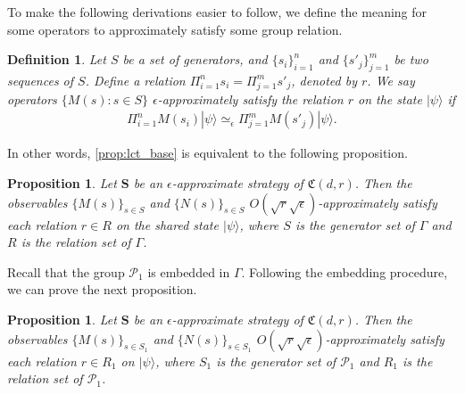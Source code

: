 \documentclass[11pt,letterpaper]{article}
\newcommand{\ket}[1]{|#1\rangle}
\newcommand{\1}{\mathbb{1}}
\newcommand{\Pg}{\mathcal{P}}
\newcommand{\fC}{\mathfrak{C}}
\newcommand{\bS}{\pmb{S}}
\newcommand{\ep}{\epsilon}
\newcommand{\se}{\sqrt{\epsilon}}
\newcommand{\sr}{\sqrt{r}}
\newcommand{\appd}[1]{\simeq_{#1}}
\newtheorem{proposition}[theorem]{Proposition}
\newtheorem{definition}[theorem]{Definition}
\theoremstyle{definition}
\begin{document}
To make the following derivations easier to follow, we define the meaning
for some operators to approximately satisfy some group relation.
\begin{definition}
    Let $S$ be a set of generators, and $\{s_i\}_{i=1}^n$ and $\{s'_j\}_{j=1}^m$
    be two sequences of $S$.
    Define a relation $\Pi_{i=1}^n s_i = \Pi_{j=1}^m s'_j$, denoted by $r$.
    We say operators $\{M(s) : s \in S\}$ $\ep$-approximately satisfy the relation
    $r$ on the state $\ket{\psi}$ if 
    \begin{align*}
        \Pi_{i=1}^n M(s_i)\ket{\psi} \appd{\ep} \Pi_{j=1}^m M(s'_j) \ket{\psi}. 
    \end{align*}
\end{definition}
In other words, \cref{prop:lct_base} is equivalent to the following proposition.
\begin{proposition}
    \label{prop:lct_group}
    Let $\bS$ be an $\ep$-approximate strategy of $\fC(d,r)$.
	Then the observables $\{ M(s) \}_{s \in S}$ and
	$\{N(s)\}_{s \in S}$ $O(\sr \se)$-approximately satisfy
	each relation $r \in R$ on the shared state $\ket{\psi}$, 
	where $S$ is the generator set of $\Gamma$
    and $R$ is the relation set of $\Gamma$.	
\end{proposition}
Recall that the group $\Pg_1$ is embedded in $\Gamma$.
Following the embedding procedure, we can prove the next proposition.
\begin{proposition}
    \label{prop:lct_pg1}
    Let $\bS$ be an $\ep$-approximate strategy of $\fC(d,r)$.
	Then the observables $\{ M(s) \}_{s \in S_1}$ and
	$\{N(s)\}_{s \in S_1}$ $O(\sr\se)$-approximately satisfy
	each relation $r \in R_1$ on $\ket{\psi}$, 
	where $S_1$ is the generator set of $\Pg_1$
    and $R_1$ is the relation set of $\Pg_1$.	
\end{proposition}
\end{document}
